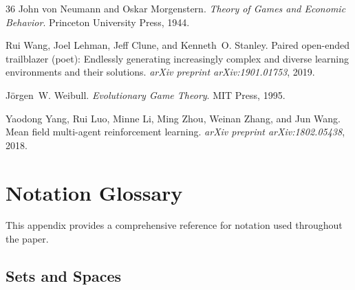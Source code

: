 \documentclass[12pt]{article}
\begin{document}
\begin{thebibliography}{36}
John von Neumann and Oskar Morgenstern.
\newblock \emph{Theory of Games and Economic Behavior}.
\newblock Princeton University Press, 1944.

Rui Wang, Joel Lehman, Jeff Clune, and Kenneth~O. Stanley.
\newblock Paired open-ended trailblazer (poet): Endlessly generating
  increasingly complex and diverse learning environments and their solutions.
\newblock \emph{arXiv preprint arXiv:1901.01753}, 2019.

J{\"o}rgen~W. Weibull.
\newblock \emph{Evolutionary Game Theory}.
\newblock MIT Press, 1995.

Yaodong Yang, Rui Luo, Minne Li, Ming Zhou, Weinan Zhang, and Jun Wang.
\newblock Mean field multi-agent reinforcement learning.
\newblock \emph{arXiv preprint arXiv:1802.05438}, 2018.

\end{thebibliography}


\appendix



\appendix

\section{Notation Glossary}
\label{app:notation}

This appendix provides a comprehensive reference for notation used throughout the paper.

\subsection{Sets and Spaces}
\end{document}
